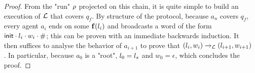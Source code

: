 \begin{proof}
	From the "run" $\rho$ projected on this chain, it is quite simple to build an execution of $\mathcal{L}$ that covers $q_f$. By structure of the protocol, because $a_n$ covers $q_f$, every agent $a_i$ ends on some $\mathbf{f}(l_i)$ and broadcasts a word of the form $\mathsf{init} \cdot l_i \cdot w_i \cdot \mathsf{\#}$; this can be proven with an immediate backwards induction. It then suffices to analyse the behavior of $a_{i+1}$ to prove that $(l_i, w_i) \xrightarrow{}_{\mathcal{L}} (l_{i+1}, w_{i+1})$. In particular, because $a_0$ is a "root", $l_0 = l_s$ and $w_0 = \epsilon$, which concludes the proof. 
\end{proof}